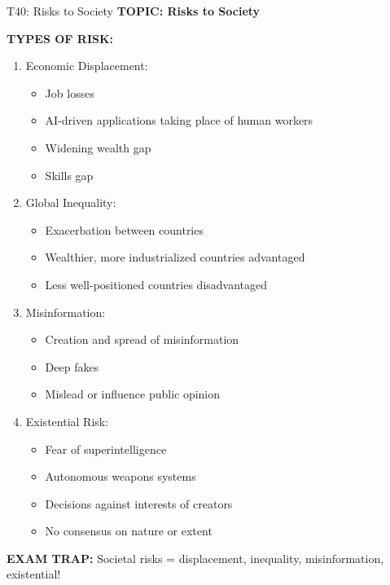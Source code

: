 \documentclass[8pt]{beamer}
\begin{document}
	\begin{frame}{T40: Risks to Society}
		\fontsize{6.5}{7.5}\selectfont
		\textbf{TOPIC: Risks to Society}
		
		\vspace{0.1cm}
		\textbf{TYPES OF RISK:}
		\begin{enumerate}
			\item \textcolor{myblue}{Economic Displacement:}
			\begin{itemize}
				\item Job losses
				\item AI-driven applications taking place of human workers
				\item Widening wealth gap
				\item Skills gap
			\end{itemize}
			\item \textcolor{myblue}{Global Inequality:}
			\begin{itemize}
				\item Exacerbation between countries
				\item Wealthier, more industrialized countries advantaged
				\item Less well-positioned countries disadvantaged
			\end{itemize}
			\item \textcolor{myblue}{Misinformation:}
			\begin{itemize}
				\item Creation and spread of misinformation
				\item Deep fakes
				\item Mislead or influence public opinion
			\end{itemize}
			\item \textcolor{myblue}{Existential Risk:}
			\begin{itemize}
				\item Fear of superintelligence
				\item Autonomous weapons systems
				\item Decisions against interests of creators
				\item No consensus on nature or extent
			\end{itemize}
		\end{enumerate}
		
		\textcolor{myred}{\textbf{EXAM TRAP:}} Societal risks = \textcolor{myblue}{displacement, inequality, misinformation, existential}!
	\end{frame}
	
\end{document}
